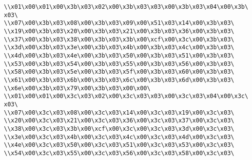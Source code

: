 \verb|\\x01\x00\x01\x00\x3b\x03\x02\x00\x3b\x03\x03\x00\x3b\x03\x04\x00\x3b\x03\|\newline
\verb|\\x07\x00\x3b\x03\x08\x00\x3b\x03\x09\x00\x51\x03\x14\x00\x3b\x03\|\newline
\verb|\\x19\x00\x3b\x03\x20\x00\x3b\x03\x21\x00\x3b\x03\x36\x00\x3b\x03\|\newline
\verb|\\x37\x00\x3b\x03\x38\x00\x3b\x03\x3b\x00\xcf\x00\x3c\x00\x3b\x03\|\newline
\verb|\\x3d\x00\x3b\x03\x3e\x00\x3b\x03\x4b\x00\x3b\x03\x4c\x00\x3b\x03\|\newline
\verb|\\x4d\x00\x3b\x03\x4e\x00\x3b\x03\x50\x00\x3b\x03\x51\x00\x3b\x03\|\newline
\verb|\\x53\x00\x3b\x03\x54\x00\x3b\x03\x55\x00\x3b\x03\x56\x00\x3b\x03\|\newline
\verb|\\x58\x00\x3b\x03\x5e\x00\x3b\x03\x5f\x00\x3b\x03\x60\x00\x3b\x03\|\newline
\verb|\\x61\x00\x3b\x03\x6b\x00\x3b\x03\x6c\x00\x3b\x03\x6d\x00\x3b\x03\|\newline
\verb|\\x6e\x00\x3b\x03\x79\x00\x3b\x03\x00\x00\|\newline
\verb|\\x01\x00\x01\x00\x3c\x03\x02\x00\x3c\x03\x03\x00\x3c\x03\x04\x00\x3c\x03\|\newline
\verb|\\x07\x00\x3c\x03\x08\x00\x3c\x03\x14\x00\x3c\x03\x19\x00\x3c\x03\|\newline
\verb|\\x20\x00\x3c\x03\x21\x00\x3c\x03\x36\x00\x3c\x03\x37\x00\x3c\x03\|\newline
\verb|\\x38\x00\x3c\x03\x3b\x00\xcf\x00\x3c\x00\x3c\x03\x3d\x00\x3c\x03\|\newline
\verb|\\x3e\x00\x3c\x03\x4b\x00\x3c\x03\x4c\x00\x3c\x03\x4d\x00\x3c\x03\|\newline
\verb|\\x4e\x00\x3c\x03\x50\x00\x3c\x03\x51\x00\x3c\x03\x53\x00\x3c\x03\|\newline
\verb|\\x54\x00\x3c\x03\x55\x00\x3c\x03\x56\x00\x3c\x03\x58\x00\x3c\x03\|\newline
